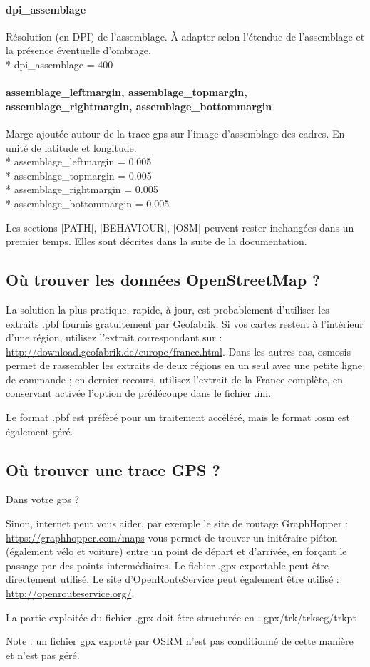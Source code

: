 \documentclass[12pt,french]{article}
\begin{document}
\paragraph{dpi\_assemblage} Résolution (en DPI) de l'assemblage. À adapter selon l'étendue de l'assemblage et la présence éventuelle d'ombrage.\\*
dpi\_assemblage = 400
\paragraph{assemblage\_leftmargin, assemblage\_topmargin, assemblage\_right\-mar\-gin, assemblage\_bottommargin} Marge ajoutée autour de la trace gps sur l'image d'assemblage des cadres. En unité de latitude et longitude.\\*
assemblage\_leftmargin = 0.005\\*
assemblage\_topmargin = 0.005\\*
assemblage\_rightmargin = 0.005\\*
assemblage\_bottommargin = 0.005\\

\par {} 
Les sections [PATH], [BEHAVIOUR], [OSM] peuvent rester inchangées dans un premier temps. Elles sont décrites dans la suite de la documentation.



\subsection{Où trouver les données OpenStreetMap ?}
\label{osmdata}
La solution la plus pratique, rapide, à jour, est probablement d'utiliser les extraits .pbf fournis gratuitement par Geofabrik. Si vos cartes restent à l'intérieur d'une région, utilisez l'extrait correspondant sur : \url{http://download.geofabrik.de/europe/france.html}. Dans les autres cas, osmosis permet de rassembler les extraits de deux régions en un seul avec une petite ligne de commande ; en dernier recours, utilisez l'extrait de la France complète, en conservant activée l'option de prédécoupe dans le fichier .ini. \par
Le format .pbf est préféré pour un traitement accéléré, mais le format .osm est également géré.

\subsection{Où trouver une trace GPS ?}
Dans votre gps ?\par 
Sinon, internet peut vous aider, par exemple le site de routage GraphHopper : \url{https://graphhopper.com/maps} vous permet de trouver un initéraire piéton (également vélo et voiture) entre un point de départ et d'arrivée, en forçant le passage par des points intermédiaires. Le fichier .gpx exportable peut être directement utilisé. Le site d'OpenRouteService peut également être utilisé : \url{http://openrouteservice.org/}.\par 
La partie exploitée du fichier .gpx doit être structurée en : gpx/trk/trkseg/trkpt\par 
Note : un fichier gpx exporté par OSRM n'est pas conditionné de cette manière et n'est pas géré.
\end{document}
